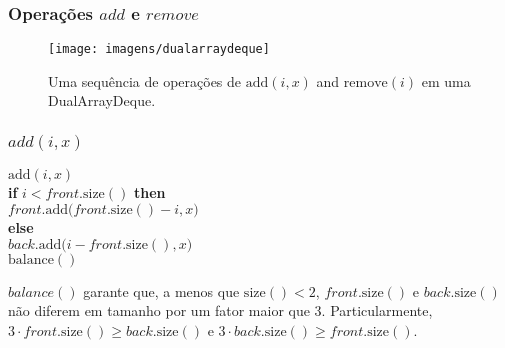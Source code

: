 \documentclass{beamer}
\begin{document}
\begin{frame}
\frametitle{Operações $add$ e $remove$}
\begin{figure}
  \begin{center}
    \texttt{[image: imagens/dualarraydeque]}
  \end{center}
  \caption[Adding and removing in a DualArrayDeque]{Uma sequência de operações de $\ensuremath{\ensuremath{\mathrm{add}(\ensuremath{\mathit{i}},\ensuremath{\mathit{x}})}}$ and $\ensuremath{\ensuremath{\mathrm{remove}(\ensuremath{\mathit{i}})}}$ em uma
  DualArrayDeque.}

\end{figure}
\end{frame}

\begin{frame}
\frametitle{$add(i,x)$}
\begin{oframed}
\begin{flushleft}
\hspace*{1em} $\ensuremath{\mathrm{add}(\ensuremath{\mathit{i}}, \ensuremath{\mathit{x}})}$\\
\hspace*{1em} \hspace*{1em} {\color{black} \textbf{if}} $\ensuremath{\ensuremath{\mathit{i}} < \ensuremath{\mathit{front}}.\mathrm{size}()}$ {\color{black} \textbf{then}} \\
\hspace*{1em} \hspace*{1em} \hspace*{1em} $\ensuremath{\ensuremath{\mathit{front}}.\mathrm{add}(\ensuremath{\mathit{front}}.\mathrm{size}()-\ensuremath{\mathit{i}}, x})$\\
\hspace*{1em} \hspace*{1em} {\color{black} \textbf{else}} \\
\hspace*{1em} \hspace*{1em} \hspace*{1em} $\ensuremath{\ensuremath{\mathit{back}}.\mathrm{add}(\ensuremath{\mathit{i}}-\ensuremath{\mathit{front}}.\mathrm{size}(), x})$\\
\hspace*{1em} \hspace*{1em} $\ensuremath{\mathrm{balance}()} $\\
\end{flushleft}
\end{oframed}

$balance()$ garante que, a menos que $\ensuremath{\ensuremath{\mathrm{size}()}}<2$,
$\ensuremath{\ensuremath{\ensuremath{\mathit{front}}.\mathrm{size}()}}$ e $\ensuremath{\ensuremath{\ensuremath{\mathit{back}}.\mathrm{size}()}}$ não diferem em tamanho por um fator maior que 3.  Particularmente, $3\cdot\ensuremath{\ensuremath{\ensuremath{\mathit{front}}.\mathrm{size}()}} \ge \ensuremath{\ensuremath{\ensuremath{\mathit{back}}.\mathrm{size}()}}$ e
$3\cdot\ensuremath{\ensuremath{\ensuremath{\mathit{back}}.\mathrm{size}()}} \ge \ensuremath{\ensuremath{\ensuremath{\mathit{front}}.\mathrm{size}()}}$.
\end{frame}
\end{document}
